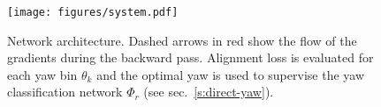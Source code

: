 \begin{figure}
\centering
\texttt{[image: figures/system.pdf]}
\caption{Network architecture. Dashed arrows in red show the flow of the gradients during the backward pass. Alignment loss is evaluated for each yaw bin $\theta_k$ and the optimal yaw is used to supervise the yaw classification network $\Phi_r$ (see sec.~\ref{s:direct-yaw}).}\label{fig:network_architecture}
\end{figure}
